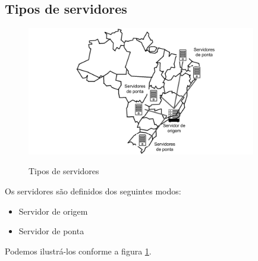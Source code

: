 \subsection{Tipos de servidores}

\begin{figure}[h]
\caption{Tipos de servidores}
\includegraphics[width=10cm]{Figuras/tipos_servidores.png} 
\label{figura:tipos_servidores} 
\end{figure}

Os servidores s\~ao definidos dos seguintes modos:
\begin{itemize}
	\item Servidor de origem
	\item Servidor de ponta
\end{itemize}

Podemos ilustr\'a-los conforme a figura \ref{figura:tipos_servidores}.
